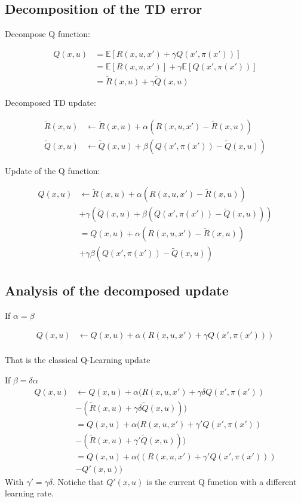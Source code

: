 \documentclass[conference]{IEEEtran}
\begin{document}
\subsection{Decomposition of the TD error}

Decompose Q function:

\begin{align}
Q(x,u) & =\mathbb{E}\left[R(x,u,x')+\gamma Q(x',\pi(x'))\right] \nonumber\\ 
 & =\mathbb{E}\left[R(x,u,x')\right]+\gamma\mathbb{E}\left[Q(x',\pi(x'))\right] \nonumber\\
 & =\tilde{R}(x,u)+\gamma\tilde{Q}(x,u)
\end{align}

Decomposed TD update:

\begin{align}
\tilde{R}(x,u) & \leftarrow\tilde{R}(x,u)+\alpha(R(x,u,x')-\tilde{R}(x,u))\\
\tilde{Q}(x,u) & \leftarrow\tilde{Q}(x,u)+\beta(Q(x',\pi(x'))-\tilde{Q}(x,u))
\end{align}

Update of the Q function:

\begin{align}
Q(x,u) & \leftarrow\tilde{R}(x,u)+\alpha(R(x,u,x')-\tilde{R}(x,u)) \nonumber\\
 & +\gamma\left(\tilde{Q}(x,u)+\beta(Q(x',\pi(x'))-\tilde{Q}(x,u))\right) \nonumber\\
 & =Q(x,u)+\alpha(R(x,u,x')-\tilde{R}(x,u)) \nonumber\\
 & +\gamma\beta(Q(x',\pi(x'))-\tilde{Q}(x,u))
\end{align}

\subsection{Analysis of the decomposed update}
If $\alpha=\beta$

\begin{align}
Q(x,u) & \leftarrow Q(x,u)+\alpha(R(x,u,x')+\gamma Q(x',\pi(x')))\\
\end{align}

That is the classical Q-Learning update

If $\beta=\delta\alpha$
\begin{align}
Q(x,u) & \leftarrow Q(x,u)+\alpha(R(x,u,x')+\gamma\delta Q(x',\pi(x')) \nonumber\\
 & -(\tilde{R}(x,u)+\gamma\delta\tilde{Q}(x,u))) \nonumber\\
 & =Q(x,u)+\alpha(R(x,u,x')+\gamma'Q(x',\pi(x')) \nonumber\\
 & -(\tilde{R}(x,u)+\gamma'\tilde{Q}(x,u))) \nonumber\\
 & =Q(x,u)+\alpha((R(x,u,x')+\gamma'Q(x',\pi(x'))) \nonumber\\
 & -Q'(x,u))
\end{align}
With $\gamma'=\gamma\delta$. Notiche that $Q'(x,u)$ is the current Q function with a different learning rate.
\end{document}
